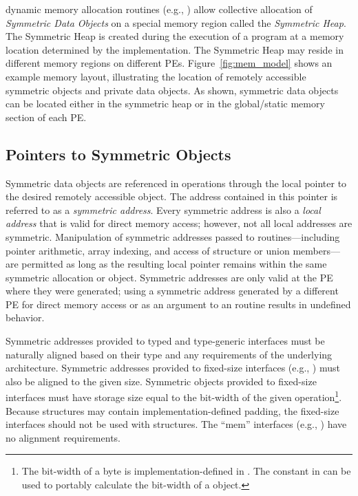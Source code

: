 \openshmem dynamic memory allocation routines (e.g.,
) allow collective allocation of \emph{Symmetric Data
Objects} on a special memory region called the \emph{Symmetric Heap}. The
Symmetric Heap is created during the execution of a program at a memory location
determined by the implementation. The Symmetric Heap may reside in different
memory regions on different \acp{PE}.
Figure~\ref{fig:mem_model} shows an example \openshmem
memory layout, illustrating the location of remotely accessible symmetric
objects and private data objects.  As shown, symmetric data objects can be
located either in the symmetric heap or in the global/static memory section of
each \ac{PE}.

\subsection{Pointers to Symmetric Objects}

Symmetric data objects are referenced in \openshmem operations through the
local pointer to the desired remotely accessible object.  The address contained
in this pointer is referred to as a {\em symmetric address}.  Every symmetric
address is also a {\em local address} that is valid for direct memory access;
however, not all local addresses are symmetric.  Manipulation of symmetric
addresses passed to \openshmem routines---including pointer arithmetic,
array indexing, and access of structure or union members---are permitted as long as
the resulting local pointer remains within the same symmetric allocation or
object.  Symmetric addresses are only valid at the \ac{PE} where they were
generated; using a symmetric address generated by a different \ac{PE} for
direct memory access or as an argument to an \openshmem routine results
in undefined behavior.

Symmetric addresses provided to typed and type-generic \openshmem interfaces
must be naturally aligned based on their type and any requirements of the
underlying architecture.  Symmetric addresses provided to fixed-size \openshmem
interfaces (e.g., ) must also be aligned to the given
size.  Symmetric objects provided to fixed-size \openshmem interfaces
must have storage size equal to the bit-width of the given
operation\footnote{The bit-width of a byte is implementation-defined in \Cstd.  The
 constant in  can be used to portably
calculate the bit-width of a \Cstd object.}.  Because \CorCpp{} structures may
contain implementation-defined padding, the fixed-size interfaces should not be
used with \CorCpp{} structures.
The ``mem'' interfaces (e.g., ) have no alignment
requirements.

